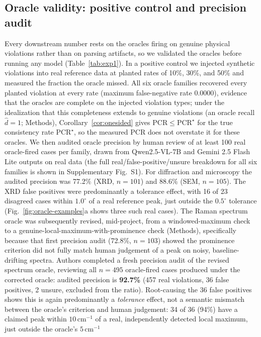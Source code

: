 \documentclass[pdflatex,sn-nature]{sn-jnl}
\providecommand{\DIFdel}[1]{{\protect\color{red} \scriptsize #1}} %
\providecommand{\DIFdelbegin}{} %
\providecommand{\DIFscaledelfig}{0.5}
\newlength{\DIFdelgraphicswidth} %
\newlength{\DIFdelgraphicsheight} %
\providecommand{\DIFdelincludegraphics}[2][]{%
\sbox{\DIFdelgraphicsbox}{\DIFOincludegraphics[#1]{#2}}%
\settoboxwidth{\DIFdelgraphicswidth}{\DIFdelgraphicsbox} %
\settoboxtotalheight{\DIFdelgraphicsheight}{\DIFdelgraphicsbox} %
\scalebox{\DIFscaledelfig}{%
\parbox[b]{\DIFdelgraphicswidth}{\usebox{\DIFdelgraphicsbox}\\[-\baselineskip] \rule{\DIFdelgraphicswidth}{0em}}\llap{\resizebox{\DIFdelgraphicswidth}{\DIFdelgraphicsheight}{%
\setlength{\unitlength}{\DIFdelgraphicswidth}%
\begin{picture}(1,1)%
\thicklines\linethickness{2pt} %
{\color[rgb]{1,0,0}\put(0,0){\framebox(1,1){}}}%
{\color[rgb]{1,0,0}\put(0,0){\line( 1,1){1}}}%
{\color[rgb]{1,0,0}\put(0,1){\line(1,-1){1}}}%
\end{picture}%
}\hspace*{3pt}}} %
} %
\DeclareRobustCommand{\DIFdelbegin}{\DIFOdelbegin \let\includegraphics\DIFdelincludegraphics} %
\begin{document}
\subsection*{Oracle validity: positive control and precision audit}
\DIFdelbegin \DIFdel{Every downstream number rests on the oracles firing on genuine physical violations
rather than on parsing artifacts, so we validated the oracles before running any model
(Table~\ref{tab:exp1}). In a positive control we injected synthetic violations into real
reference data at planted rates of 10\%, 30\%, and 50\% and measured the fraction the
oracle missed. All six oracle families recovered every planted violation at every rate
(maximum false-negative rate 0.0000), evidence that the oracles are complete on the
injected violation types; under the idealization that this completeness extends to
genuine violations (an oracle recall $\hat d=1$; Methods), Corollary~\ref{cor:onesided}
gives $\mathrm{PCR}\le\mathrm{PCR}^\star$ for the true consistency rate
$\mathrm{PCR}^\star$, so the measured PCR does not overstate it for these oracles. We then audited oracle precision by human review of
at least 100 real oracle-fired cases per family, drawn from Qwen2.5-VL-7B and Gemini 2.5
Flash Lite outputs on real data (the full real/false-positive/unsure breakdown for all six
families is shown in Supplementary Fig.~S1). For diffraction and microscopy the audited precision
was 77.2\% (XRD, $n=101$) and 88.6\% (SEM, $n=105$). The XRD
false positives were predominantly a tolerance effect, with 16 of 23 disagreed cases
within $1.0^\circ$ of a real reference peak, just outside the $0.5^\circ$ tolerance
(Fig.~\ref{fig:oracle-examples}a shows three such real cases). The Raman
spectrum oracle was subsequently revised, mid-project, from a windowed-maximum check to a
genuine-local-maximum-with-prominence check (Methods), specifically because that first
precision audit (72.8\%, $n=103$) showed the prominence criterion did not fully match human
judgement of a peak on noisy, baseline-drifting spectra. Authors completed a fresh
precision audit of the revised spectrum oracle, reviewing all $n=495$
oracle-fired cases produced under the corrected oracle: audited precision is
\textbf{92.7\%} (457 real violations, 36 false positives, 2 unsure, excluded from the
ratio). Root-causing the 36 false positives shows this is again predominantly a
\emph{tolerance} effect, not a semantic mismatch between the oracle's criterion and human
judgement: 34 of 36 (94\%) have a claimed peak within $10\,\mathrm{cm}^{-1}$ of a real,
independently detected local maximum, just outside the oracle's $5\,\mathrm{cm}^{-1}$
}
\end{document}
